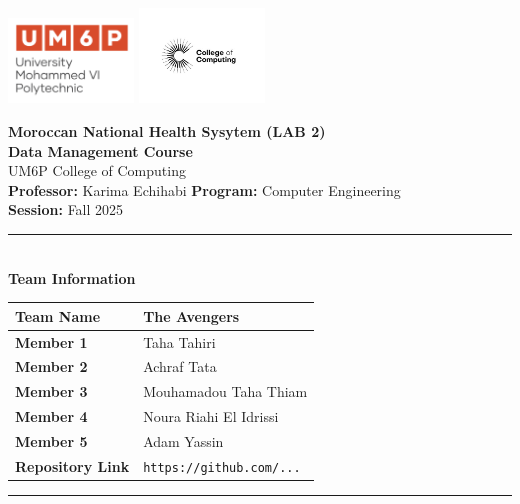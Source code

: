 \documentclass[a4paper,12pt]{article}
\begin{document}
\thispagestyle{empty}
\begin{center}
    \includegraphics[width=0.25\textwidth]{Figures/UM6Plogo.png}\hfill
    \includegraphics[width=0.25\textwidth]{Figures/CC.jpg}
    \vspace{1.2cm}

    {\LARGE \textbf{Moroccan National Health Sysytem (LAB 2)}}\\[0.6cm]
    {\large \textbf{Data Management Course}}\\[0.2cm]
    {\large UM6P College of Computing}\\[0.8cm]

    {\normalsize \textbf{Professor:} Karima Echihabi \quad 
    \textbf{Program:} Computer Engineering}\\[0.1cm]
    {\normalsize \textbf{Session:} Fall 2025}\\[1cm]

    \rule{0.9\textwidth}{0.5pt}\\[0.5cm]
    {\large \textbf{Team Information}} \\[0.3cm]
    \begin{tabular}{|l|l|}
        \hline
        \textbf{Team Name} & The Avengers \\ \hline
        \textbf{Member 1}  & Taha Tahiri  \\ \hline
        \textbf{Member 2}  & Achraf Tata  \\ \hline
        \textbf{Member 3}  & Mouhamadou Taha Thiam \\ \hline
        \textbf{Member 4}  & Noura Riahi El Idrissi  \\ \hline
        \textbf{Member 5}  & Adam Yassin  \\ \hline
        \textbf{Repository Link} & \texttt{https://github.com/...} \\ \hline
    \end{tabular}
    \rule{0.9\textwidth}{0.5pt}\\
\end{center}
\clearpage
\pagestyle{fancy}
\end{document}
